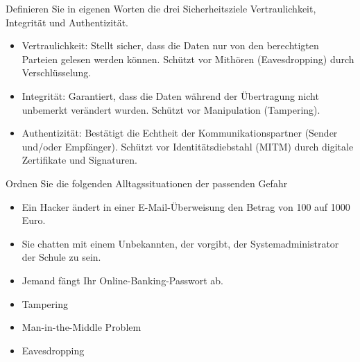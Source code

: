         \begin{myexercise}
            Definieren Sie in eigenen Worten die drei Sicherheitsziele Vertraulichkeit, Integrität und Authentizität.
            \begin{myanswer}
                \begin{itemize}
                    \item Vertraulichkeit: Stellt sicher, dass die Daten nur von den berechtigten Parteien gelesen werden können. Schützt vor Mithören (Eavesdropping) durch Verschlüsselung.
                    \item Integrität: Garantiert, dass die Daten während der Übertragung nicht unbemerkt verändert wurden. Schützt vor Manipulation (Tampering).
                    \item Authentizität: Bestätigt die Echtheit der Kommunikationspartner (Sender und/oder Empfänger). Schützt vor Identitätsdiebstahl (MITM) durch digitale Zertifikate und Signaturen.
                \end{itemize}
            \end{myanswer}
        \end{myexercise}

        \begin{myexercise}
            Ordnen Sie die folgenden Alltagssituationen der passenden Gefahr
            \begin{itemize}
                \item Ein Hacker ändert in einer E-Mail-Überweisung den Betrag von 100 auf 1000 Euro.
                \item Sie chatten mit einem Unbekannten, der vorgibt, der Systemadministrator der Schule zu sein.
                \item Jemand fängt Ihr Online-Banking-Passwort ab.
            \end{itemize}
            \begin{myanswer}
                \begin{itemize}
                    \item Tampering
                    \item Man-in-the-Middle Problem
                    \item Eavesdropping
                \end{itemize}
            \end{myanswer}
        \end{myexercise}

